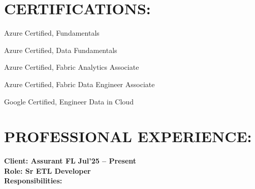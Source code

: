 \documentclass[a4paper,10pt]{article}
\begin{document}
\section*{CERTIFICATIONS:}
Azure Certified, Fundamentals

Azure Certified, Data Fundamentals

Azure Certified, Fabric Analytics Associate

Azure Certified, Fabric Data Engineer Associate

Google Certified, Engineer Data in Cloud

\section*{PROFESSIONAL EXPERIENCE:}
\textbf{Client: Assurant FL} \hfill \textbf{Jul'25 – Present} \\
\textbf{Role: Sr ETL Developer} \\
\textbf{Responsibilities:}
\end{document}

